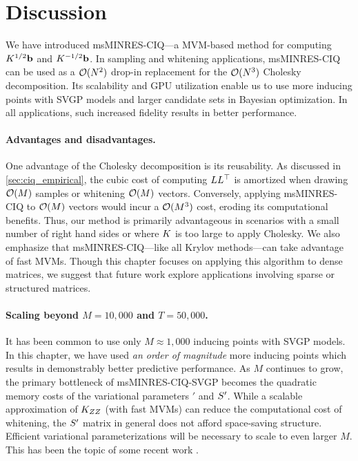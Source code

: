 \section{Discussion}

We have introduced msMINRES-CIQ---a MVM-based method for computing $K^{1/2} \mathbf{b}$ and $K^{-1/2} \mathbf{b}$.
In sampling and whitening applications, msMINRES-CIQ can be used as a $\bigo{N^2}$ drop-in replacement for the $\bigo{N^3}$ Cholesky decomposition.
Its scalability and GPU utilization enable us to use more inducing points with SVGP models and larger candidate sets in Bayesian optimization.
In all applications, such increased fidelity results in better performance.


\paragraph{Advantages and disadvantages.}
One advantage of the Cholesky decomposition is its reusability.
As discussed in \cref{sec:ciq_empirical}, the cubic cost of computing $L L^\top$ is amortized when drawing $\bigo{M}$ samples or whitening $\bigo{M}$ vectors.
Conversely, applying msMINRES-CIQ to $\bigo{M}$ vectors would incur a $\bigo{M^3}$ cost, eroding its computational benefits. Thus, our method is primarily advantageous
in scenarios with a small number of right hand sides or where $K$ is too large to apply Cholesky.
We also emphasize that msMINRES-CIQ---like all Krylov methods---can take advantage of fast MVMs.
Though this chapter focuses on applying this algorithm to dense matrices, we suggest that future work explore applications involving sparse or structured matrices.


\paragraph{Scaling beyond $M=10,\!000$ and $T=50,\!000$.}
It has been common to use only $M\approx1,\!000$ inducing points with SVGP models.
In this chapter, we have used \emph{an order of magnitude} more inducing points which results in demonstrably better predictive performance.
As $M$ continues to grow, the primary bottleneck of msMINRES-CIQ-SVGP becomes the quadratic memory costs of the variational parameters $\bm'$ and $S'$.
While a scalable approximation of $K_{ZZ}$ (with fast MVMs) can reduce the computational cost of whitening, the $S'$ matrix in general does not afford space-saving structure.
Efficient variational parameterizations will be necessary to scale to even larger $M$.
This has been the topic of some recent work \cite{wilson2016stochastic,cheng2017variational,salimbeni2018orthogonally,shi2019sparse}.

